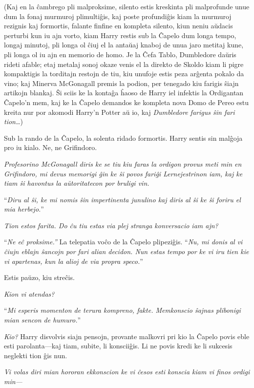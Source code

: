 (Kaj en la ĉambrego pli malproksime, silento estis kreskinta pli
malprofunde unue dum la fonaj murmuroj plimultiĝis, kaj poste
profundiĝis kiam la murmuroj rezignis kaj formortis, falante finfine
en kompleta silento, kiun neniu aŭdacis perturbi kun iu ajn vorto,
kiam Harry restis sub la Ĉapelo dum longa tempo, longaj minutoj, pli
longa ol ĉiuj el la antaŭaj knaboj de unua jaro metitaj kune, pli
longa ol iu ajn en memorio de homo. Je la Ĉefa Tablo, Dumbledore
daŭris rideti afable; etaj metalaj sonoj okaze venis el la direkto de
Skoldo kiam li pigre kompaktigis la torditajn restojn de tiu, kiu
unufoje estis peza arĝenta pokalo da vino; kaj Minerva McGonagall
premis la podion, per tenegado kiu farigis ŝiajn artikojn blankaj. Ŝi
sciis ke la kontaĝa ĥaoso de Harry iel infektis la Ordigantan Ĉapelo'n
mem, kaj ke la Ĉapelo demandos ke kompleta nova Domo de Pereo estu
kreita nur por akomodi Harry'n Potter aŭ io, kaj \emph{Dumbledore
  farigus ŝin fari tion\ldots})

Sub la rando de la Ĉapelo, la solenta ridado formortis. Harry sentis
sin malĝoja pro iu kialo. Ne, ne Grifindoro.

\emph{Profesorino McGonagall diris ke se tiu kiu faras la ordigon
  provus meti min en Grifindoro, mi devus memorigi ĝin ke ŝi povos
  fariĝi Lernejestrinon iam, kaj ke tiam ŝi havontus la aŭtoritatecon
  por bruligi vin.}

``\emph{Diru al ŝi, ke mi nomis ŝin impertinenta junulino kaj diris al
  ŝi ke ŝi foriru el mia herbejo.}''

\emph{Tion estos farita. Do ĉu tiu estas via plej stranga konversacio
  iam ajn?}

``\emph{Ne eĉ proksime.''} La telepatia voĉo de la Ĉapelo
plipeziĝis. ``\emph{Nu, mi donis al vi ĉiujn eblajn ŝancojn por fari
  alian decidon. Nun estas tempo por ke vi iru tien kie vi apartenas,
  kun la alioj de via propra speco.}''

Estis paŭzo, kiu streĉis.

\emph{Kion vi atendas?}

``\emph{Mi esperis momenton de terura kompreno, fakte. Memkonscio
  ŝajnas plibonigi mian sencon de humuro.}''

\emph{Kio?} Harry disvolvis siajn pensojn, provante malkovri pri kio
la Ĉapelo povis eble esti parolanta—kaj tiam, subite, li
konsciiĝis. Li ne povis kredi ke li sukcesis neglekti tion ĝis nun.

\emph{Vi volas diri mian hororan ekkonscion ke vi ĉesos esti konscia
kiam vi finos ordigi min—}


